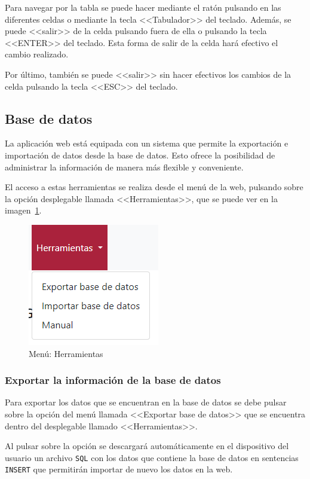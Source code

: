 Para navegar por la tabla se puede hacer mediante el ratón pulsando en las diferentes celdas o mediante la tecla <<Tabulador>> del teclado. Además, se puede <<salir>> de la celda pulsando fuera de ella o pulsando la tecla <<ENTER>> del teclado.
Esta forma de salir de la celda hará efectivo el cambio realizado.

Por último, también se puede <<salir>> sin hacer efectivos los cambios de la celda pulsando la tecla <<ESC>> del teclado.

\subsection{Base de datos}
La aplicación web está equipada con un sistema que permite la exportación e importación de datos desde la base de datos. Esto ofrece la posibilidad de administrar la información de manera más flexible y conveniente.

El acceso a estas herramientas se realiza desde el menú de la web, pulsando sobre la opción desplegable llamada <<Herramientas>>, que se puede ver en la imagen~\ref{pag:menu herramientas}.

\begin{figure}
	\centering
	\includegraphics[width=.4\textwidth]{../img/Anexos/Manual usuario/menu herramientas.png}
	\caption{Menú: Herramientas}\label{pag:menu herramientas}
\end{figure}

\subsubsection{Exportar la información de la base de datos}
Para exportar los datos que se encuentran en la base de datos se debe pulsar sobre la opción del menú llamada <<Exportar base de datos>> que se encuentra dentro del desplegable llamado <<Herramientas>>.

Al pulsar sobre la opción se descargará automáticamente en el dispositivo del usuario un archivo \texttt{SQL} con los datos que contiene la base de datos en sentencias \texttt{INSERT} que permitirán importar de nuevo los datos en la web.


